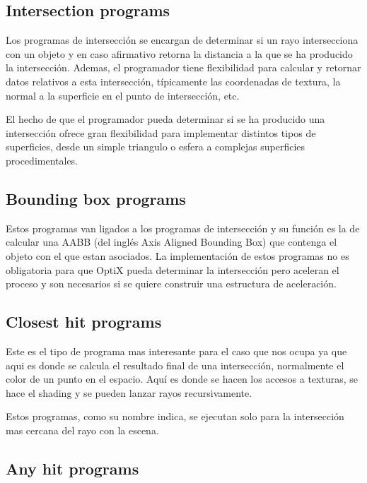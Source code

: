 \subsection{Intersection programs}

Los programas de intersección se encargan de determinar si un rayo intersecciona con un objeto y en caso afirmativo retorna la distancia a la que se ha producido la intersección. Ademas, el programador tiene flexibilidad para calcular y retornar datos relativos a esta intersección, típicamente las coordenadas de textura, la normal a la superficie en el punto de intersección, etc.

\medskip

El hecho de que el programador pueda determinar si se ha producido una intersección ofrece gran flexibilidad para implementar distintos tipos de superficies, desde un simple triangulo o esfera a complejas superficies procedimentales.

\subsection{Bounding box programs}

Estos programas van ligados a los programas de intersección y su función es la de calcular una AABB (del inglés Axis Aligned Bounding Box) que contenga el objeto con el que estan asociados. La implementación de estos programas no es obligatoria para que OptiX pueda determinar la intersección pero aceleran el proceso y son necesarios si se quiere construir una estructura de aceleración.

\subsection{Closest hit programs}

Este es el tipo de programa mas interesante para el caso que nos ocupa ya que aqui es donde se calcula el resultado final de una intersección, normalmente el color de un punto en el espacio. Aquí es donde se hacen los accesos a texturas, se hace el shading y se pueden lanzar rayos recursivamente.

\medskip

Estos programas, como su nombre indica, se ejecutan solo para la intersección mas cercana del rayo con la escena.

\subsection{Any hit programs}

